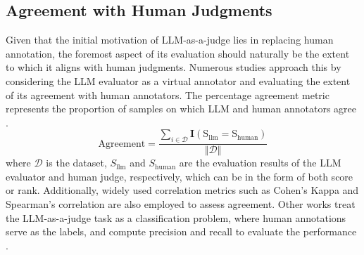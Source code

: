 \subsection{Agreement with Human Judgments}
\label{Evaluation:base metric}
Given that the initial motivation of LLM-as-a-judge lies in replacing human annotation, the foremost aspect of its evaluation should naturally be the extent to which it aligns with human judgments.
Numerous studies approach this by considering the LLM evaluator as a virtual annotator and evaluating the extent of its agreement with human annotators.
The percentage agreement metric represents the proportion of samples on which LLM and human annotators agree \cite{thakur2024judging}. 
$$\text{Agreement} = \frac{\sum_{i\in \mathcal{D}} \mathbf{I}(\text{S}_{\text{llm}} = \text{S}_{\text{human}})}{ \Vert \mathcal{D} \Vert}$$
where $\mathcal{D}$ is the dataset, $S_{\text{llm}}$ and $S_{\text{human}} $ are the evaluation results of the LLM evaluator and human judge, respectively, which can be in the form of both score or rank.
Additionally, widely used correlation metrics such as Cohen's Kappa \cite{thakur2024judging} and Spearman's correlation \cite{liu2024aligning, lm-as-an-examiner} are also employed to assess agreement.
Other works treat the LLM-as-a-judge task as a classification problem, where human annotations serve as the labels, and compute precision and recall to evaluate the performance \cite{zhu2023judgelm, wang2023pandalm}.



